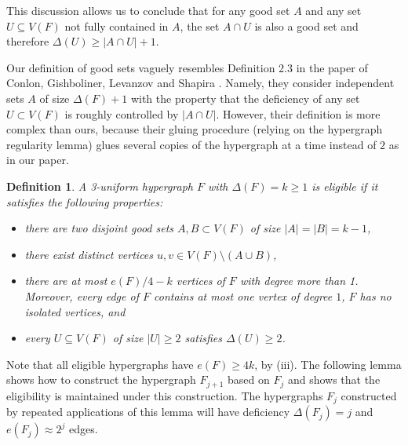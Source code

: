 \documentclass{daj}
\theoremstyle{plain}
\newtheorem{definition}[theorem]{Definition}
\theoremstyle{remark}
\begin{document}
This discussion allows us to conclude that for any good set $A$ and any set $U\subseteq V(F)$ not fully contained in $A$, the set $A\cap U$ is also a good set and therefore $\Delta(U)\geq |A\cap U|+1$. 

Our definition of good sets vaguely resembles Definition 2.3 in the paper of Conlon, Gishboliner, Levanzov and Shapira \cite{CGLS23}. Namely, they consider independent sets $A$ of size $\Delta(F)+1$ with the property that the deficiency of any set $U\subset V(F)$ is roughly controlled by $|A\cap U|$. However, their definition is more complex than ours, because their gluing procedure (relying on the hypergraph regularity lemma) glues several copies of the hypergraph at a time instead of $2$ as in our paper.

\begin{definition}\label{defn:eligible}
A 3-uniform hypergraph $F$ with $\Delta(F)=k\geq 1$ is \textit{eligible} if it satisfies the following properties:
\begin{itemize}
    \item[(i)] there are two disjoint good sets $A, B\subset V(F)$ of size $|A|=|B|=k-1$,
    \item[(ii)] there exist distinct vertices $u, v \in V(F) \setminus (A \cup B)$,
    \item[(iii)] there are at most $e(F)/4-k$ vertices of $F$ with degree more than 1. Moreover, every edge of $F$ contains at most one vertex of degree $1$, $F$ has no isolated vertices, and
    \item[(iv)] every $U\subseteq V(F)$ of size $|U|\geq 2$ satisfies $\Delta(U)\geq 2$.
\end{itemize}
\end{definition}

\noindent
Note that all eligible hypergraphs have $e(F)\geq 4k$, by (iii). The following lemma shows how to construct the hypergraph $F_{j+1}$ based on $F_j$ and shows that the eligibility is maintained under this construction. The hypergraphs $F_j$ constructed by repeated applications of this lemma will have deficiency $\Delta(F_j)=j$ and $e(F_j)\approx 2^j$ edges.
\end{document}
